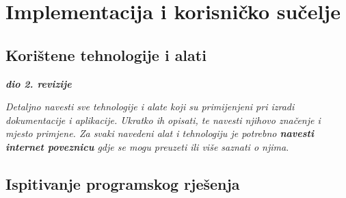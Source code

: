 \chapter{Implementacija i korisničko sučelje}
		
		
		\section{Korištene tehnologije i alati}
		
			\textbf{\textit{dio 2. revizije}}
			
			 \textit{Detaljno navesti sve tehnologije i alate koji su primijenjeni pri izradi dokumentacije i aplikacije. Ukratko ih opisati, te navesti njihovo značenje i mjesto primjene. Za svaki navedeni alat i tehnologiju je potrebno \textbf{navesti internet poveznicu} gdje se mogu preuzeti ili više saznati o njima}.
			
			
			\eject 
		
	
		\section{Ispitivanje programskog rješenja}
			

